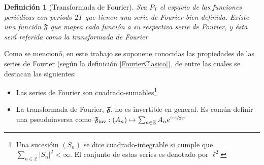 \documentclass[12pt,a4paper]{mitthesis}
\newtheorem{defn}{Definici\'on}
\newcommand{\abso}[1]{\left| #1 \right|}
\begin{document}
\begin{defn}[Transformada de Fourier]
Sea $P_T$ el espacio de las funciones peri\'odicas con periodo $2T$ que tienen una
serie de Fourier bien definida. Existe una funci\'on
$\mathfrak{F}$ que mapea cada funci\'on a su
respectiva serie de Fourier, y \'esta ser\'a referida como la transformada de Fourier
\label{trFourier}
\end{defn}


Como se mencion\'o, en este trabajo se suponene conocidas las propiedades de 
las series de Fourier (seg\'un la definici\'on \ref{FourierClasico}),
de entre las cuales se destacan las siguientes:
\begin{itemize}
\item Las series de Fourier  son cuadrado-sumables\footnote{Una sucesi\'oin $\left( S_n \right)$ 
se dice cuadrado-integrable si cumple que $\sum_{n\in \mathbb{Z}} \abso{S_n}^{2} < \infty$. El
conjunto de estas series es denotado por $\ell^{2}$}

\item La transformada de Fourier, $\mathfrak{F}$, no es invertible en general. Es com\'un definir
una pseudoinversa como 
$\mathfrak{F}_{\text{inv}} : \left( A_n \right) \mapsto \sum_{n \in \mathbb{Z}} A_n e^{\nicefrac{i n t}{2 T}} $
\end{itemize}
\end{document}

